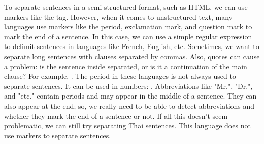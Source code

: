 \documentclass{KBook}
\begin{document}
To separate sentences in a semi-structured format, such as HTML, we can use markers like the  tag. 
However, when it comes to unstructured text, many languages use markers like the period, exclamation mark, and question mark to mark the end of a sentence. 
In this case, we can use a simple regular expression \expword{/[.?!]/} to delimit sentences in languages like French, English, etc. 
Sometimes, we want to separate long sentences with clauses separated by commas. 
Also, quotes can cause a problem: is the sentence inside separated, or is it a continuation of the main clause? 
For example, .
The period in these languages is not always used to separate sentences. 
It can be used in numbers: .
Abbreviations like "Mr.", "Dr.", and "etc." contain periods and may appear in the middle of a sentence. 
They can also appear at the end; so, we really need to be able to detect abbreviations and whether they mark the end of a sentence or not. 
If all this doesn't seem problematic, we can still try separating Thai sentences. 
This language does not use markers to separate sentences.
\end{document}

